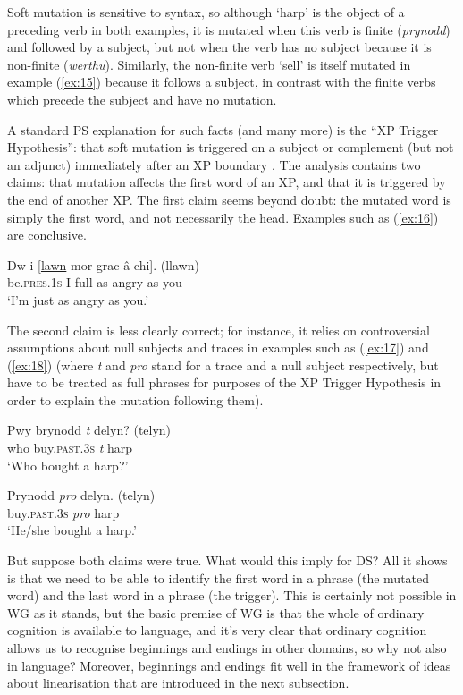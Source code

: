 \documentclass[output=paper
	        ,collection
	        ,collectionchapter
 	        ,biblatex
                ,babelshorthands
                ,newtxmath
                ,draftmode
                ,colorlinks, citecolor=brown
]{./langsci/langscibook}
\begin{document}
Soft mutation is sensitive to syntax, so although ‘harp’ is the object of a preceding verb in both examples, it is mutated when this verb is finite (\emph{prynodd}) and followed by a subject, but not when the verb has no subject because it is non-finite (\emph{werthu}). Similarly, the non-finite verb ‘sell’ is itself mutated in example (\ref{ex:15}) because it follows a subject, in contrast with the finite verbs which precede the subject and have no mutation.

A standard PS explanation for such facts (and many more) is the ``XP Trigger Hypothesis'': that soft mutation is triggered on a subject or complement (but not an adjunct) immediately after an XP boundary \citep[226]{BorsleyTallermanWillis2007}. The analysis contains two claims: that mutation affects the first word of an XP, and that it is triggered by the end of another XP. The first claim seems beyond doubt: the mutated word is simply the first word, and not necessarily the head. Examples such as (\ref{ex:16}) are conclusive.

\begin{exe}
	\ex \label{ex:16}
	\gll Dw i [\underline{lawn} mor grac â chi]. (llawn)\\
	be.\textsc{pres}.1\textsc{s} I full as angry as you\\
	\glt ‘I’m just as angry as you.’
\end{exe}

The second claim is less clearly correct; for instance, it relies on controversial assumptions about null subjects and traces in examples such as (\ref{ex:17}) and (\ref{ex:18}) (where \emph{t} and \emph{pro} stand for a trace and a null subject respectively, but have to be treated as full phrases for purposes of the XP Trigger Hypothesis in order to explain the mutation following them).

\begin{exe}
	\ex \label{ex:17}
	\gll Pwy brynodd \emph{t} delyn? (telyn)\\
	who buy.\textsc{past}.3\textsc{s} \emph{t} harp\\
	\glt ‘Who bought a harp?’

	\ex \label{ex:18}
	\gll Prynodd \emph{pro} delyn. (telyn)\\
	buy.\textsc{past}.3\textsc{s} \emph{pro} harp\\
	\glt ‘He/she bought a harp.’
\end{exe}

But suppose both claims were true. What would this imply for DS? All it shows is that we need to be able to identify the first word in a phrase (the mutated word) and the last word in a phrase (the trigger). This is certainly not possible in WG as it stands, but the basic premise of WG is that the whole of ordinary cognition is available to language, and it’s very clear that ordinary cognition allows us to recognise beginnings and endings in other domains, so why not also in language? Moreover, beginnings and endings fit well in the framework of ideas about linearisation that are introduced in the next subsection.
\end{document}
